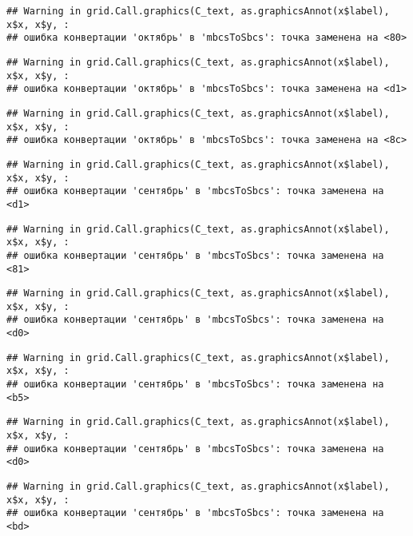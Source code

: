 \documentclass[
]{article}
\begin{document}
\begin{verbatim}
## Warning in grid.Call.graphics(C_text, as.graphicsAnnot(x$label), x$x, x$y, :
## ошибка конвертации 'октябрь' в 'mbcsToSbcs': точка заменена на <80>
\end{verbatim}

\begin{verbatim}
## Warning in grid.Call.graphics(C_text, as.graphicsAnnot(x$label), x$x, x$y, :
## ошибка конвертации 'октябрь' в 'mbcsToSbcs': точка заменена на <d1>
\end{verbatim}

\begin{verbatim}
## Warning in grid.Call.graphics(C_text, as.graphicsAnnot(x$label), x$x, x$y, :
## ошибка конвертации 'октябрь' в 'mbcsToSbcs': точка заменена на <8c>
\end{verbatim}

\begin{verbatim}
## Warning in grid.Call.graphics(C_text, as.graphicsAnnot(x$label), x$x, x$y, :
## ошибка конвертации 'сентябрь' в 'mbcsToSbcs': точка заменена на <d1>
\end{verbatim}

\begin{verbatim}
## Warning in grid.Call.graphics(C_text, as.graphicsAnnot(x$label), x$x, x$y, :
## ошибка конвертации 'сентябрь' в 'mbcsToSbcs': точка заменена на <81>
\end{verbatim}

\begin{verbatim}
## Warning in grid.Call.graphics(C_text, as.graphicsAnnot(x$label), x$x, x$y, :
## ошибка конвертации 'сентябрь' в 'mbcsToSbcs': точка заменена на <d0>
\end{verbatim}

\begin{verbatim}
## Warning in grid.Call.graphics(C_text, as.graphicsAnnot(x$label), x$x, x$y, :
## ошибка конвертации 'сентябрь' в 'mbcsToSbcs': точка заменена на <b5>
\end{verbatim}

\begin{verbatim}
## Warning in grid.Call.graphics(C_text, as.graphicsAnnot(x$label), x$x, x$y, :
## ошибка конвертации 'сентябрь' в 'mbcsToSbcs': точка заменена на <d0>
\end{verbatim}

\begin{verbatim}
## Warning in grid.Call.graphics(C_text, as.graphicsAnnot(x$label), x$x, x$y, :
## ошибка конвертации 'сентябрь' в 'mbcsToSbcs': точка заменена на <bd>
\end{verbatim}
\end{document}
